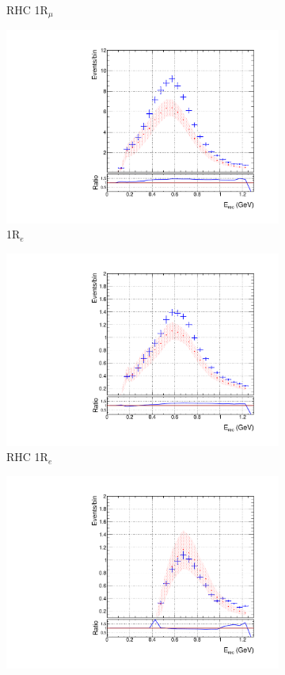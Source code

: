 \begin{figure}
\begin{subfigure}{.49\textwidth}
   \caption{RHC 1R$_{\mu}$}
  \label{fig:skppnumubar}
\end{subfigure}
\begin{subfigure}{.49\textwidth}
  \centering
  \includegraphics[width=0.95\linewidth]{figs/skspecnue}
  \caption{1R$_{e}$}
  \label{fig:skppnue}
\end{subfigure}
\begin{subfigure}{.49\textwidth}
  \centering
  \includegraphics[width=0.95\linewidth]{figs/skspecnuebar}
   \caption{RHC 1R$_{e}$}
  \label{fig:skppnuebar}
  \end{subfigure}
\begin{subfigure}{.49\textwidth}
  \centering
  \includegraphics[width=0.95\linewidth]{figs/skspecnue1pi}

\end{subfigure}
\end{figure}
